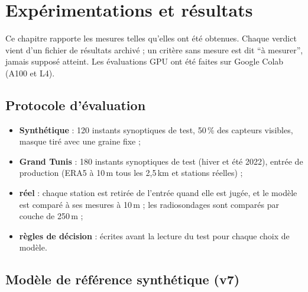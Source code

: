 \chapter{Expérimentations et résultats}
\label{chap:resultats}

Ce chapitre rapporte les mesures telles qu'elles ont été obtenues. Chaque verdict vient d'un
fichier de résultats archivé ; un critère sans mesure est dit \enquote{à mesurer}, jamais supposé
atteint. Les évaluations GPU ont été faites sur Google Colab (A100 et L4).

\section{Protocole d'évaluation}
\begin{itemize}
  \item \textbf{Synthétique} : 120 instants synoptiques de test, 50\,\% des capteurs visibles, masque
        tiré avec une graine fixe ;
  \item \textbf{Grand Tunis} : 180 instants synoptiques de test (hiver et été 2022), entrée de
        production (ERA5 à 10\,m tous les 2,5\,km et stations réelles) ;
  \item \textbf{réel} : chaque station est retirée de l'entrée quand elle est jugée, et le modèle
        est comparé à ses mesures à 10\,m ; les radiosondages sont comparés par couche de 250\,m ;
  \item \textbf{règles de décision} : écrites avant la lecture du test pour chaque choix de modèle.
\end{itemize}

\section{Modèle de référence synthétique (v7)}


